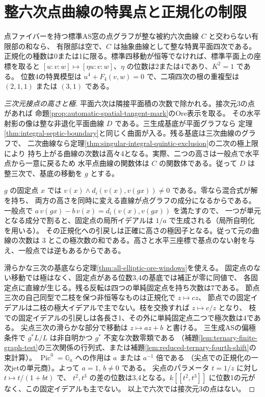 \section{整六次点曲線の特異点と正規化の制限}
\label{sec:singular-sextic-normalization}
\begin{theorem}\label{thm:singular-sextic-normalization}
点ファイバーを持つ標準AS窓の点グラフが整な被約六次曲線 $C$ と交わらない有限部の和なら、
有限部は空で、$C$ は抽象曲線として整な特異平面四次である。
正規化の種数は0または1に限る。標準四移動が恒等でなければ、標準平面上の座標を取ると
$[u:v:w]\mapsto[\eta u:v:w]$、$\eta$ の位数は2または4であり、$K^2=1$ である。
位数4の特異模型は $u^4+F_4(v,w)=0$ で、二項四次の根の重複型は $(2,1,1)$ または $(3,1)$ である。
\end{theorem}
\begin{proof}[三次元接点の高さと極]
平面六次は隣接平面積の次数で除かれる。接次元3の点があれば
命題\ref{prop:automatic-spatial-tangent-mark}のOre表示を取る。
その水平射影の像は整な非退化平面曲線 $D$ である。三生成基底が平面グラフなら
定理\ref{thm:integral-septic-boundary}と同じく曲面が入る。残る基底は三次曲線のグラフで、
二次曲線なら定理\ref{thm:singular-integral-quintic-exclusion}の二次の極上限により
持ち上がる曲線の次数は高々4となる。実際、二つの高さは一般点で水平点から一意に戻るため
水平点曲線の関数体は $C$ の関数体である。従って $D$ は整三次で、基底の移動を $g$ とする。

$g$ の固定点 $x$ では $v(x)\wedge d_i(v(x),v(gx))\ne0$ である。零なら混合式が解を持ち、
両方の高さを同時に変える直線が点グラフの成分になるからである。
一般点で $a\,v(gx)-b\,v(x)=d_i(v(x),v(gx))$ を満たすので、
一つが単元となる成分で割ると、固定点の局所イデアルは $1/a$ で生成される（局所自明化を用いる）。
その正規化への引戻しは正確に高さの極因子となる。従って元の曲線の次数は
$3$ とこの極次数の和である。高さと水平三座標で基点のない射を与え、一般点では逆もあるからである。

滑らかな三次の基底なら定理\ref{thm:all-elliptic-ore-windows}を使える。
固定点のない移動では極はなく、固定点がある位数3,4の基底では補正が零に同値で、
各固定点に直線が生じる。残る反転は四つの単純固定点を持ち次数は7である。
節点三次の自己同型で二枝を保つ非恒等なものは正規化で $z\mapsto cz$、
節点での固定イデアルは二枝の極大イデアルで主でない。枝を交換すれば $z\mapsto c/z$ となり、
枝での固定イデアルの引戻しは各長さ1、その外に単純固定点二つで極次数は4である。
尖点三次の滑らかな部分で移動は $z\mapsto az+b$ と書ける。
三生成ASの偏極条件で $g^*L/L$ は非自明かつ $g^*$ 不変な次数零類である
（補題\ref{lem:ternary-finite-graph-test}の三次関係の行列式、または補題\ref{lem:reduced-ternary-fourth-shift}の束計算）。
$\operatorname{Pic}^0=\mathbb G_a$ への作用は $a$ または $a^{-1}$ 倍である
（尖点での正規化の一次jetの単元商）。よって $a=1$, $b\ne0$ である。
尖点のパラメータ $t=1/z$ に対し $t\mapsto t/(1+bt)$ で、
$t^2,t^3$ の差の位数は3,4となる。$k[[t^2,t^3]]$ に位数1の元がなく、この固定イデアルも主でない。
以上で六次では接次元3の点はない。


\end{proof}
